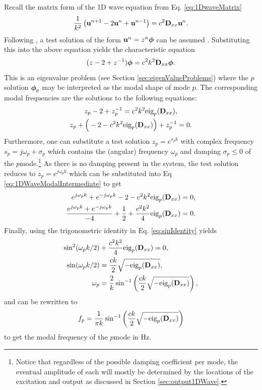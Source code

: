 {{Recall the matrix form of the 1D wave equation from Eq. \eqref{eq:1DwaveMatrix}
\begin{equation*}
    \frac{1}{k^2}\left(\mathbf{u}^{n+1}-2\mathbf{u}^n+\mathbf{u}^{n-1}\right) = c^2 \mathbf{D}_{xx}\mathbf{u}^n.
\end{equation*}
Following \cite{theBible}, a test solution of the form $\mathbf{u}^n = z^n\boldsymbol{\phi}$ can be assumed . Substituting this into the above equation yields the characteristic equation
\begin{equation}
    (z - 2 + z^{-1})\boldsymbol{\phi} = c^2k^2\mathbf{D}_{xx} \boldsymbol{\phi}.
\end{equation}
This is an eigenvalue problem (see Section \ref{sec:eigenValueProblems}) where the $p$\th solution $\boldsymbol{\phi}_p$ may be interpreted as the modal shape of mode $p$. The corresponding modal frequencies are the solutions to the following equations:
\begin{gather}\label{eq:1DWaveModalIntermediate}
    z_p-2+z_p^{-1} = c^2k^2\text{eig}_p(\mathbf{D}_{xx}),\nonumber\\
    z_p+\Big(-2-c^2k^2\text{eig}_p(\mathbf{D}_{xx})\Big)+z_p^{-1}=0.
\end{gather}
Furthermore, one can substitute a test solution $z_p = e^{s_pk}$ with complex frequency $s_p = j\omega_p + \sigma_p$ which contains the (angular) frequency $\omega_p$ and damping $\sigma_p \leq 0$  of the $p$\th mode.\footnote{Notice that regardless of the possible damping coefficient per mode, the eventual amplitude of each will mostly be determined by the locations of the excitation and output as discussed in Section \ref{sec:output1DWave}.} As there is no damping present in the system, the test solution reduces to $z_p = e^{j\omega_p k}$ which can be substituted into Eq \eqref{eq:1DWaveModalIntermediate} to get
\begin{align*}
    e^{j\omega_pk}+e^{-j\omega_pk}-2-c^2k^2\text{eig}_p(\mathbf{D}_{xx})&=0,\\
    \frac{e^{j\omega_pk}+e^{-j\omega_pk}}{-4}+\frac{1}{2}+\frac{c^2k^2}{4}\text{eig}_p(\mathbf{D}_{xx})&=0.
\end{align*}
Finally, using the trigonometric identity in Eq. \eqref{eq:sinIdentity} yields
\begin{align}
    \sin^2(\omega_pk/2)&+\frac{c^2k^2}{4}\text{eig}_p(\mathbf{D}_{xx})=0,\nonumber\\
    \sin(\omega_pk/2)&=\frac{ck}{2}\sqrt{-\text{eig}_p(\mathbf{D}_{xx})},\nonumber\\
    \omega_p &= \frac{2}{k}\sin^{-1}\left(\frac{ck}{2}\sqrt{-\text{eig}_p(\mathbf{D}_{xx})}\right),\label{eq:1DWaveModesAngular}
\end{align}
and can be rewritten to 
\begin{equation}
    f_p = \frac{1}{\pi k}\sin^{-1}\left(\frac{ck}{2}\sqrt{-\text{eig}_p(\mathbf{D}_{xx})}\right)\label{eq:1DWaveModes}
\end{equation}
to get the modal frequency of the $p$\th mode in Hz. 

}}
